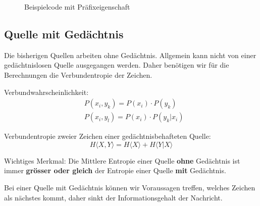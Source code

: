 \begin{figure}[H]
	\caption{Beispielcode mit Präfixeigenschaft}
\end{figure}


\subsection{Quelle mit Gedächtnis}

Die bisherigen Quellen arbeiten ohne Gedächtnis. Allgemein kann nicht von einer
gedächtnislosen Quelle ausgegangen werden. Daher benötigen wir für die
Berechnungen die Verbundentropie der Zeichen.

Verbundwahrscheinlichkeit:
\begin{align*}
	&P(x_i, y_k) = P(x_i) \cdot P(y_k) \\
	&P(x_i, y_l) = P(x_i) \cdot P(y_k|x_i)
\end{align*}

Verbundentropie zweier Zeichen einer gedächtnisbehafteten Quelle:
\[
	H \langle X,Y \rangle = H \langle X \rangle + H \langle Y|X \rangle
\]

Wichtiges Merkmal: Die Mittlere Entropie einer Quelle \textbf{ohne} Gedächtnis
ist immer \textbf{grösser oder gleich} der Entropie einer Quelle \textbf{mit}
Gedächtnis.

Bei einer Quelle mit Gedächtnis können wir Voraussagen treffen, welches Zeichen
als nächstes kommt, daher sinkt der Informationsgehalt der Nachricht.
